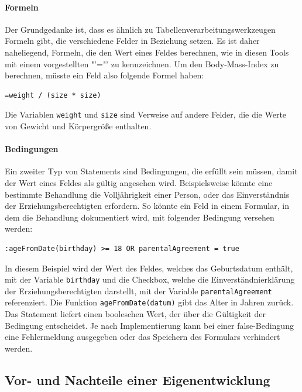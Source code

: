 \paragraph*{Formeln}

Der Grundgedanke ist, dass es ähnlich zu Tabellenverarbeitungs\-werkzeugen Formeln gibt, die verschiedene Felder in Beziehung setzen. Es ist daher naheliegend, Formeln, die den Wert eines Feldes berechnen,	 wie in diesen Tools mit einem vorgestellten "'="' zu kennzeichnen. Um den Body-Mass-Index zu berechnen, müsste ein Feld also folgende Formel haben:

\begin{verbatim}
=weight / (size * size)
\end{verbatim}

Die Variablen \texttt{weight} und \texttt{size} sind Verweise auf andere Felder, die die Werte von Gewicht und Kör\-per\-grö\-ße enthalten.

\paragraph*{Bedingungen}

Ein zweiter Typ von Statements sind Bedingungen, die erfüllt sein müssen, damit der Wert eines Feldes als gültig angesehen wird. Beispielsweise könnte eine bestimmte Behandlung die Volljährigkeit einer Person, oder das Einverständnis der Erziehungsberechtigten erfordern. So könnte ein Feld in einem Formular, in dem die Behandlung dokumentiert wird, mit folgender Bedingung versehen werden:

\begin{verbatim}
:ageFromDate(birthday) >= 18 OR parentalAgreement = true
\end{verbatim}

In diesem Beispiel wird der Wert des Feldes, welches das Geburtsdatum enthält, mit der Variable \texttt{birthday} und die Checkbox, welche die Einverständnierklärung der Erziehungsberechtigten darstellt, mit der Variable \texttt{parentalAgreement} referenziert. Die Funktion \texttt{ageFromDate(datum)} gibt das Alter in Jahren zurück. Das Statement liefert einen booleschen Wert, der über die Gültigkeit der Bedingung entscheidet. Je nach Implementierung kann bei einer false-Bedingung eine Fehlermeldung ausgegeben oder das Speichern des Formulars verhindert werden.

\subsection{Vor- und Nachteile einer Eigenentwicklung}


